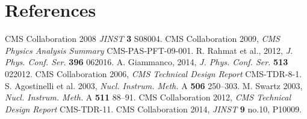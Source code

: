 \documentclass[a4paper]{jpconf}
\begin{document}
\section*{References}
\begin{thebibliography}{99}
 CMS Collaboration 2008 {\it JINST} \textbf{3} S08004.
 CMS Collaboration 2009, {\it CMS Physics Analysis Summary} CMS-PAS-PFT-09-001.
 R. Rahmat et al., 2012, {\it J. Phys. Conf. Ser.} \textbf{396} 062016.
 A. Giammanco, 2014, {\it J. Phys. Conf. Ser.} \textbf{513} 022012.
 CMS Collaboration 2006, {\it CMS Technical Design Report} CMS-TDR-8-1.
 S. Agostinelli et al. 2003, {\it Nucl. Instrum. Meth.} A \textbf{506} 250--303. 
 M. Swartz 2003, {\it Nucl. Instrum. Meth.} A \textbf{511} 88--91.
 CMS Collaboration 2012, {\it CMS Technical Design Report} CMS-TDR-11.
 CMS Collaboration 2014, {\it JINST} \textbf{9} no.10, P10009.

\end{thebibliography}
\end{document}
